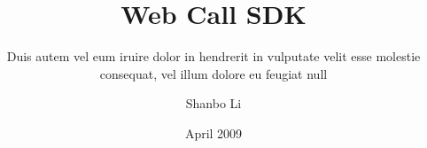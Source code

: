 \title{Web Call SDK}
\subtitle{Duis autem vel eum iruire dolor in hendrerit in
          vulputate velit esse molestie consequat, vel illum
          dolore eu feugiat null}
\author{Shanbo Li}
\date{April 2009}
